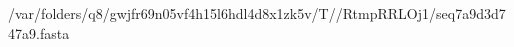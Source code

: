 \documentclass[10pt]{article}
\begin{document}
\begin{texshade}{/var/folders/q8/gwjfr69n05vf4h15l6hdl4d8x1zk5v/T//RtmpRRLOj1/seq7a9d3d747a9.fasta}
\hidelogoscale
{}
\showlegend
\end{texshade}
\end{document}

